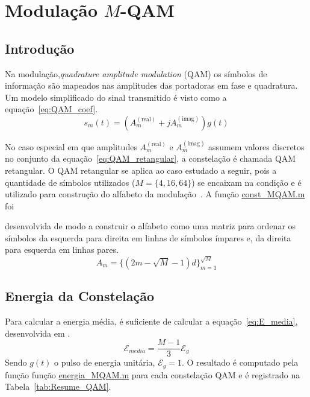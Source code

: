 \section{Modulação \texorpdfstring{$M$}{M}-QAM}

\subsection{Introdução}
Na modulação,\textit{quadrature amplitude modulation} (QAM) os símbolos de informação são mapeados nas amplitudes das portadoras em fase e quadratura. Um modelo simplificado do sinal transmitido é visto como a equação~\ref{eq:QAM_coef}.
\begin{equation}
    s_m(t) = ( A_m^{(\text{real})} + j A_m^{(\text{imag})}) g(t)
    \label{eq:QAM_coef}
\end{equation}

No caso especial em que amplitudes $A_m^{(\text{real})}$ e $A_m^{(\text{imag})}$ assumem valores discretos no conjunto da equação~\ref{eq:QAM_retangular}, a constelação é chamada QAM retangular. O QAM retangular se aplica ao caso estudado a seguir, pois a quantidade de símbolos utilizados ($M = \{4, 16, 64\}$) se encaixam na condição e é utilizado para construção do alfabeto da modulação~\cite{Cecilio}. A função \href{https://raw.githubusercontent.com/lucasabdalah/Courses-HWs/SCD/Sistemas%20de%20Comunicacoes%20Digitais/matlab/problema1/const_MQAM.m}{\colorbox{gray!20}{\color{red}const\_MQAM.m}} foi

desenvolvida de modo a construir o alfabeto como uma matriz para ordenar os símbolos da esquerda para direita em linhas de símbolos ímpares e, da direita para esquerda em linhas pares.
\begin{equation}
    A_m = \{(2m -\sqrt{M} - 1)d \}_{m=1}^{\sqrt{M}}
    \label{eq:QAM_retangular}
\end{equation}


\subsection{Energia da Constelação} 
Para calcular a energia média, é suficiente de calcular a equação~\ref{eq:E_media}, desenvolvida em \cite{Cecilio,Proakis}.
\begin{equation}
    \mathcal{E}_{media} = \frac{M-1}{3} \mathcal{E}_g
    \label{eq:E_media}
\end{equation}
Sendo $g(t)$ o pulso de energia unitária, $\mathcal{E}_g = 1$. O resultado é computado pela função função \href{https://raw.githubusercontent.com/lucasabdalah/Courses-HWs/SCD/Sistemas%20de%20Comunicacoes%20Digitais/matlab/problema1/energia_MQAM.m}{\colorbox{gray!20}{\color{red}energia\_MQAM.m}} para cada constelação QAM e é registrado na Tabela~\ref{tab:Resume_QAM}.

